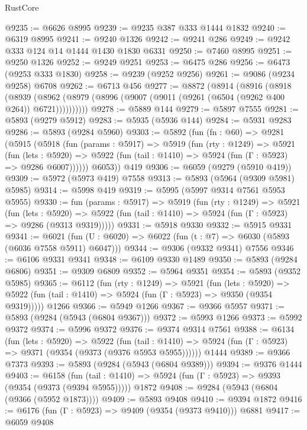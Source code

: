\begin{lexlean}{RustCore}
\begin{coremodule}
@9235 := @6626 @8995
@9239 := @9235 @387 @333 @1444 @1832
@9240 := @6319 @8995
@9241 := @9240 @1326
@9242 := @9241 @286
@9249 := @9242 @333 @124 @14 @1444 @1430 @1830 @6331
@9250 := @7460 @8995
@9251 := @9250 @1326
@9252 := @9249 @9251
@9253 := @6475 @286
@9256 := @6473 (@9253 @333 @1830)
@9258 := @9239 (@9252 @9256)
@9261 := @9086 (@9234 @9258) @6708
@9262 := @6713 @456
@9277 := @8872
    (@8914
      (@8916
        (@8918
          (@8939 (@8962 (@8979 (@8996 (@9007 (@9011 (@9261 (@6504 (@9262 @400 @264)) @6721))))))))))
@9278 := @5889 @144
@9279 := @5897 @7555
@9281 := @5893 (@9279 @5912)
@9283 := @5935 (@5936 @144)
@9284 := @5931 @9283
@9286 := @5893 (@9284 @5960)
@9303 := @5892
    (fun (fn : @60) =>
    @9281
      (@5915
        (@5918
          (fun (params : @5917) =>
          @5919
            (fun (rty : @1249) =>
            @5921
              (fun (lets : @5920) =>
              @5922 (fun (tail : @1410) => @5924 (fun (Γ : @5923) => @9286 @6007))))))
        @6053))
    @419
@9306 := @6059 (@9279 (@5910 @419))
@9309 := @5972 (@5973 @419) @7558
@9313 := @5893 (@5964 (@9309 @5981) @5985)
@9314 := @5998 @419
@9319 := @5995 (@5997 @9314 @7561 @5953 @5955)
@9330 := fun (params : @5917) =>
  @5919
    (fun (rty : @1249) =>
    @5921
      (fun (lets : @5920) =>
      @5922 (fun (tail : @1410) => @5924 (fun (Γ : @5923) => @9286 (@9313 @9319)))))
@9331 := @5918 @9330
@9332 := @5915 @9331
@9341 := @6021 (fun (U : @6020) => @6022 (fun (t : @7) => @6030 (@5893 (@6036 @7558 @5911) @6047)))
@9344 := @9306 (@9332 @9341) @7556
@9346 := @6106 @9331 @9341
@9348 := @6109 @9330 @1489
@9350 := @5893 (@9284 @6806)
@9351 := @9309 @6809
@9352 := @5964 @9351
@9354 := @5893 (@9352 @5985)
@9365 := @6112
    (fun (rty : @1249) =>
    @5921
      (fun (lets : @5920) =>
      @5922 (fun (tail : @1410) => @5924 (fun (Γ : @5923) => @9350 (@9354 @9319)))))
    @1266
@9366 := @5949 @1266
@9367 := @9366 @5957
@9371 := @5893 (@9284 (@5943 (@6804 @9367)))
@9372 := @5993 @1266
@9373 := @5992 @9372
@9374 := @5996 @9372
@9376 := @9374 @9314 @7561
@9388 := @6134
    (fun (lets : @5920) =>
    @5922
      (fun (tail : @1410) => @5924 (fun (Γ : @5923) => @9371 (@9354 (@9373 (@9376 @5953 @5955))))))
    @1444
@9389 := @9366 @7373
@9393 := @5893 (@9284 (@5943 (@6804 @9389)))
@9394 := @9376 @1444
@9403 := @6158
    (fun (tail : @1410) => @5924 (fun (Γ : @5923) => @9393 (@9354 (@9373 (@9394 @5955)))))
    @1872
@9408 := @9284 (@5943 (@6804 (@9366 (@5952 @1873))))
@9409 := @5893 @9408
@9410 := @9394 @1872
@9416 := @6176 (fun (Γ : @5923) => @9409 (@9354 (@9373 @9410))) @6881
@9417 := @6059 @9408

\end{coremodule}
\end{lexlean}
